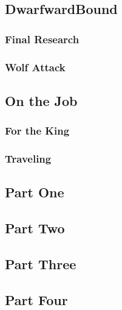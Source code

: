

\subsection{DwarfwardBound}


\subsubsection{Final Research}


\subsubsection{Wolf Attack}


\subsection{On the Job}


\subsubsection{For the King}


\subsubsection{Traveling}


\subsection{Part One}


\subsection{Part Two}


\subsection{Part Three}


\subsection{Part Four}


